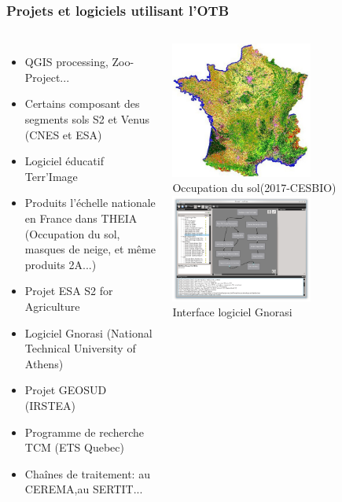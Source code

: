 \documentclass[8pt]{beamer}
\begin{document}
\begin{frame}
  \frametitle{Projets et logiciels utilisant l'OTB}
  \vspace{-0.5cm}
\begin{columns}
  \begin{itemize}
    \item QGIS processing, Zoo-Project...
    \item Certains composant des segments sols S2 et
      Venus (CNES et ESA)
    \item Logiciel éducatif Terr'Image
    \item Produits l'échelle nationale en France
      dans THEIA (Occupation du sol, masques de neige, et même produits 2A...)
    \item Projet ESA S2 for Agriculture
    \item Logiciel Gnorasi (National Technical University of Athens)
    \item Projet GEOSUD (IRSTEA)
    \item Programme de recherche TCM (ETS Quebec)
    \item Chaînes de traitement: au CEREMA,au SERTIT...
  \end{itemize}
\begin{center}
  \includegraphics[width=0.6\textwidth,height=0.35\textheight]{images/oso-2017.jpeg}\\
  \tiny{Occupation du sol(2017-CESBIO)}
  \includegraphics[width=0.6\textwidth]{images/gnorasi2.png}\\
  \tiny{Interface logiciel Gnorasi}
\end{center}
\end{columns}
\end{frame}
\end{document}
